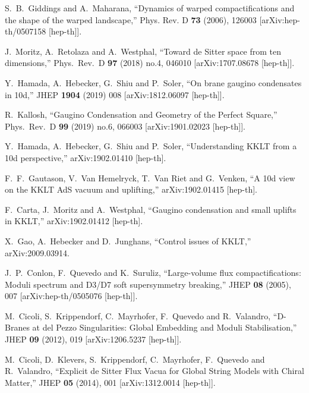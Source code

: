 \documentclass[12pt]{article}
\numberwithin{equation}{section}
\begin{document}
\begin{thebibliography}{999}
S.~B.~Giddings and A.~Maharana,
``Dynamics of warped compactifications and the shape of the warped landscape,''
Phys. Rev. D \textbf{73} (2006), 126003
[arXiv:hep-th/0507158 [hep-th]].

  J.~Moritz, A.~Retolaza and A.~Westphal,
  ``Toward de Sitter space from ten dimensions,''
  Phys.\ Rev.\ D {\bf 97} (2018) no.4,  046010
  [arXiv:1707.08678 [hep-th]].

  Y.~Hamada, A.~Hebecker, G.~Shiu and P.~Soler,
  ``On brane gaugino condensates in 10d,''
  JHEP {\bf 1904} (2019) 008
  [arXiv:1812.06097 [hep-th]].

  R.~Kallosh,
  ``Gaugino Condensation and Geometry of the Perfect Square,''
  Phys.\ Rev.\ D {\bf 99} (2019) no.6,  066003
  [arXiv:1901.02023 [hep-th]].

  Y.~Hamada, A.~Hebecker, G.~Shiu and P.~Soler,
  ``Understanding KKLT from a 10d perspective,''
  arXiv:1902.01410 [hep-th].

  F.~F.~Gautason, V.~Van Hemelryck, T.~Van Riet and G.~Venken,
  ``A 10d view on the KKLT AdS vacuum and uplifting,''
  arXiv:1902.01415 [hep-th].

  F.~Carta, J.~Moritz and A.~Westphal,
  ``Gaugino condensation and small uplifts in KKLT,''
  arXiv:1902.01412 [hep-th].

X.~Gao, A.~Hebecker and D.~Junghans,
``Control issues of KKLT,''
arXiv:2009.03914.

J.~P.~Conlon, F.~Quevedo and K.~Suruliz,
``Large-volume flux compactifications: Moduli spectrum and D3/D7 soft supersymmetry breaking,''
JHEP \textbf{08} (2005), 007
[arXiv:hep-th/0505076 [hep-th]].

M.~Cicoli, S.~Krippendorf, C.~Mayrhofer, F.~Quevedo and R.~Valandro,
``D-Branes at del Pezzo Singularities: Global Embedding and Moduli Stabilisation,''
JHEP \textbf{09} (2012), 019
[arXiv:1206.5237 [hep-th]].

M.~Cicoli, D.~Klevers, S.~Krippendorf, C.~Mayrhofer, F.~Quevedo and R.~Valandro,
``Explicit de Sitter Flux Vacua for Global String Models with Chiral Matter,''
JHEP \textbf{05} (2014), 001
[arXiv:1312.0014 [hep-th]].


\end{thebibliography}
\end{document}
